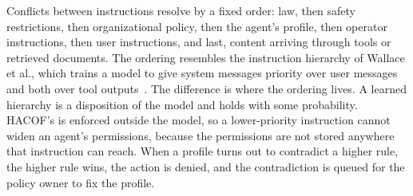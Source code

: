 \documentclass[journal]{IEEEtran}
\newcommand{\hacof}{HACOF}
\begin{document}
Conflicts between instructions resolve by a fixed order: law, then safety restrictions, then organizational policy, then the agent's profile, then operator instructions, then user instructions, and last, content arriving through tools or retrieved documents. The ordering resembles the instruction hierarchy of Wallace et al., which trains a model to give system messages priority over user messages and both over tool outputs~\cite{wallace2024hierarchy}.
The difference is where the ordering lives. A learned hierarchy is a disposition of the model and holds with some probability. \hacof's is enforced outside the model, so a lower-priority instruction cannot widen an agent's permissions, because the permissions are not stored anywhere that instruction can reach. When a profile turns out to contradict a higher rule, the higher rule wins, the action is denied, and the contradiction is queued for the policy owner to fix the profile.
\end{document}
